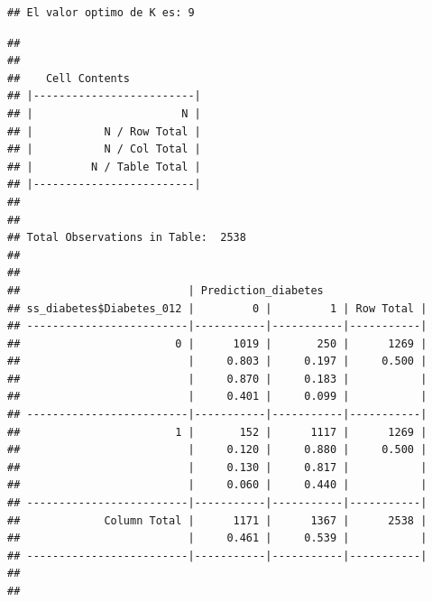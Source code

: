 \documentclass[
]{article}
\newenvironment{Shaded}{\begin{snugshade}}{\end{snugshade}}
\newcommand{\AttributeTok}[1]{\textcolor[rgb]{0.13,0.29,0.53}{#1}}
\newcommand{\FunctionTok}[1]{\textcolor[rgb]{0.13,0.29,0.53}{\textbf{#1}}}
\newcommand{\NormalTok}[1]{#1}
\newcommand{\OtherTok}[1]{\textcolor[rgb]{0.56,0.35,0.01}{#1}}
\newcommand{\SpecialCharTok}[1]{\textcolor[rgb]{0.81,0.36,0.00}{\textbf{#1}}}
\begin{document}
\begin{verbatim}
## El valor optimo de K es: 9
\end{verbatim}

\begin{Shaded}
\end{Shaded}

\begin{verbatim}
## 
##  
##    Cell Contents
## |-------------------------|
## |                       N |
## |           N / Row Total |
## |           N / Col Total |
## |         N / Table Total |
## |-------------------------|
## 
##  
## Total Observations in Table:  2538 
## 
##  
##                          | Prediction_diabetes 
## ss_diabetes$Diabetes_012 |         0 |         1 | Row Total | 
## -------------------------|-----------|-----------|-----------|
##                        0 |      1019 |       250 |      1269 | 
##                          |     0.803 |     0.197 |     0.500 | 
##                          |     0.870 |     0.183 |           | 
##                          |     0.401 |     0.099 |           | 
## -------------------------|-----------|-----------|-----------|
##                        1 |       152 |      1117 |      1269 | 
##                          |     0.120 |     0.880 |     0.500 | 
##                          |     0.130 |     0.817 |           | 
##                          |     0.060 |     0.440 |           | 
## -------------------------|-----------|-----------|-----------|
##             Column Total |      1171 |      1367 |      2538 | 
##                          |     0.461 |     0.539 |           | 
## -------------------------|-----------|-----------|-----------|
## 
## 
\end{verbatim}
\end{document}
